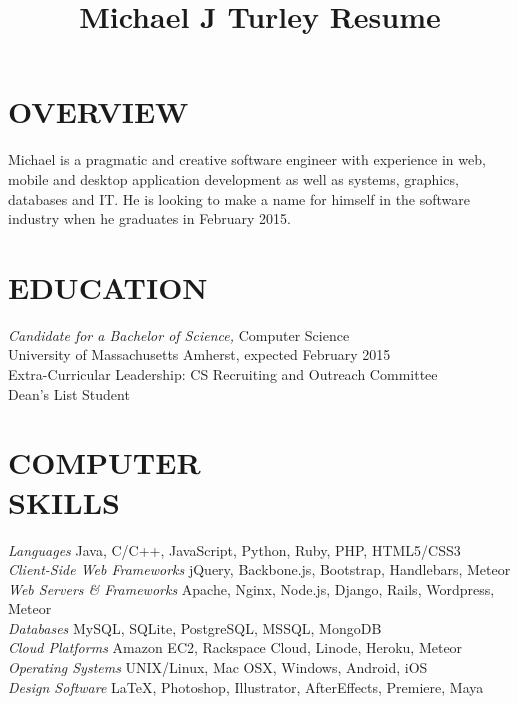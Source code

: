 \documentclass[line,margin]{res}
\begin{document}
\title{Michael J Turley Resume}

\address{248 Amherst Road Apt 217, Sunderland, MA 01375}
\address{781-264-6283  --  mike@miketurley.com -- github.com/mturley}

\begin{resume}
 
\section{OVERVIEW}
    Michael is a pragmatic and creative software engineer with experience in web, mobile and desktop application development as well as systems, graphics, databases and IT.  He is looking to make a name for himself in the software industry when he graduates in February 2015.
 
 
\section{EDUCATION}
    {\sl Candidate for a Bachelor of Science,} Computer Science \\
    University of Massachusetts Amherst, 
    expected February 2015 \\
    Extra-Curricular Leadership: CS Recruiting and Outreach Committee \\
    Dean's List Student

 
\section{COMPUTER \\ SKILLS}
    {\sl Languages} \hfill Java, C/C++, JavaScript, Python, Ruby, PHP, HTML5/CSS3 \\
    {\sl Client-Side Web Frameworks} \hfill jQuery, Backbone.js, Bootstrap, Handlebars, Meteor \\
    {\sl Web Servers \& Frameworks} \hfill Apache, Nginx, Node.js, Django, Rails, Wordpress, Meteor \\
    {\sl Databases} \hfill MySQL, SQLite, PostgreSQL, MSSQL, MongoDB \\
    {\sl Cloud Platforms} \hfill Amazon EC2, Rackspace Cloud, Linode, Heroku, Meteor \\
    {\sl Operating Systems} \hfill UNIX/Linux, Mac OSX, Windows, Android, iOS \\
    {\sl Design Software} \hfill \LaTeX, Photoshop, Illustrator, AfterEffects, Premiere, Maya
 

\end{resume}
\end{document}
